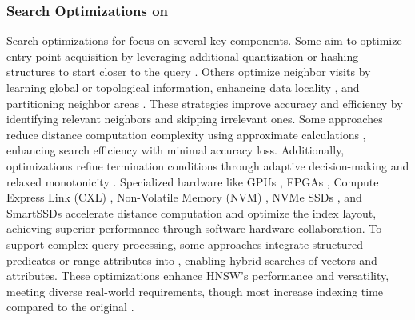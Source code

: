 \subsubsection{\textbf{Search Optimizations on }}
\label{subsubsec: Search Opt HNSW}
Search optimizations for  focus on several key components. Some aim to optimize entry point acquisition by leveraging additional quantization or hashing structures to start closer to the query \cite{HVS,zhao2023towards}. Others optimize neighbor visits by learning global \cite{LearnToRoute} or topological \cite{MunozDT19} information, enhancing data locality \cite{ColemanSSS22}, and partitioning neighbor areas \cite{TOGG}. These strategies improve accuracy and efficiency by identifying relevant neighbors and skipping irrelevant ones. Some approaches reduce distance computation complexity using approximate calculations \cite{ADSampling,Finger,yang2024bridging,lu2024probabilistic}, enhancing search efficiency with minimal accuracy loss. Additionally, optimizations refine termination conditions through adaptive decision-making \cite{LiZAH20,LiuZHSLLDYW22,yang2021tao} and relaxed monotonicity \cite{zhang2023vbase}.
Specialized hardware like GPUs \cite{SONG}, FPGAs \cite{jiang2024accelerating,ZengZLZDZLNXYW23,PengCWYWGLBSJLD21}, Compute Express Link (CXL) \cite{CXL-ANNS}, Non-Volatile Memory (NVM) \cite{HM_ANN}, NVMe SSDs \cite{Starling}, and SmartSSDs \cite{SmartSSD} accelerate distance computation and optimize the  index layout, achieving superior performance through software-hardware collaboration. To support complex query processing, some approaches integrate structured predicates \cite{PatelKGZ24,NHQ} or range attributes \cite{ZuoQZLD24} into , enabling hybrid searches of vectors and attributes. These optimizations enhance HNSW's performance and versatility, meeting diverse real-world requirements, though most increase indexing time compared to the original .

